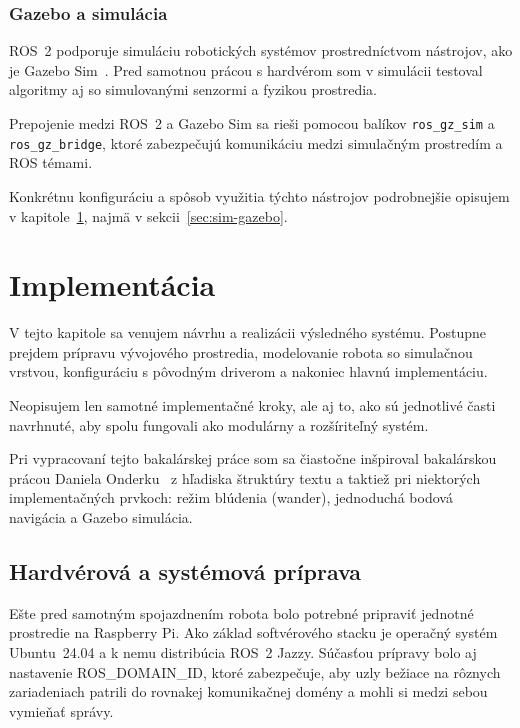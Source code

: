       \subsection*{Gazebo a simulácia}
      
      ROS~2 podporuje simuláciu robotických systémov prostredníctvom nástrojov, ako je Gazebo Sim~\cite{gazebo}. Pred samotnou prácou s hardvérom som v simulácii testoval algoritmy aj so simulovanými senzormi a fyzikou prostredia.
      
      Prepojenie medzi ROS~2 a Gazebo Sim sa rieši pomocou balíkov \texttt{ros\_gz\_sim} a \texttt{ros\_gz\_bridge}, ktoré zabezpečujú komunikáciu medzi simulačným prostredím a ROS témami.
      
      Konkrétnu konfiguráciu a spôsob využitia týchto nástrojov podrobnejšie opisujem v kapitole~\ref{kap:implementacia}, najmä v sekcii~\ref{sec:sim-gazebo}.
      
        \chapter{Implementácia}
        \label{kap:implementacia}
      
        V tejto kapitole sa venujem návrhu a realizácii výsledného systému. Postupne prejdem prípravu vývojového prostredia, modelovanie robota so simulačnou vrstvou, konfiguráciu s pôvodným driverom a nakoniec hlavnú implementáciu.
      
          Neopisujem len samotné implementačné kroky, ale aj to, ako sú jednotlivé časti navrhnuté, aby spolu fungovali ako modulárny a rozšíriteľný systém.
      
        Pri vypracovaní tejto bakalárskej práce som sa čiastočne inšpiroval bakalárskou prácou Daniela Onderku~\cite{onderka2024mobilecamera} z hľadiska štruktúry textu a taktiež pri niektorých implementačných prvkoch: režim blúdenia (wander), jednoduchá bodová navigácia a Gazebo simulácia.
      
      
        \section{Hardvérová a systémová príprava}
        \label{sec:setup-pred-spojazdnenim}
      
        Ešte pred samotným spojazdnením robota bolo potrebné pripraviť jednotné prostredie na Raspberry Pi. Ako základ softvérového stacku je operačný systém Ubuntu~24.04 a k nemu distribúcia ROS~2 Jazzy. Súčasťou prípravy bolo aj nastavenie ROS\_DOMAIN\_ID, ktoré zabezpečuje, aby uzly bežiace na rôznych zariadeniach patrili do rovnakej komunikačnej domény a mohli si medzi sebou vymieňať správy.
      
